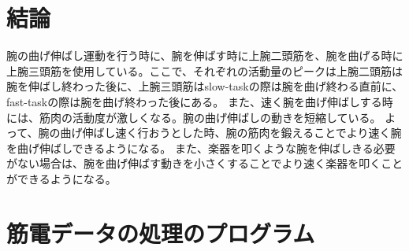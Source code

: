 \documentclass{jsarticle}
\begin{document}
% 
% 




\section{結論}
腕の曲げ伸ばし運動を行う時に、腕を伸ばす時に上腕二頭筋を、腕を曲げる時に上腕三頭筋を使用している。ここで、それぞれの活動量のピークは上腕二頭筋は腕を伸ばし終わった後に、上腕三頭筋はslow-taskの際は腕を曲げ終わる直前に、fast-taskの際は腕を曲げ終わった後にある。
また、速く腕を曲げ伸ばしする時には、筋肉の活動度が激しくなる。腕の曲げ伸ばしの動きを短縮している。
よって、腕の曲げ伸ばし速く行おうとした時、腕の筋肉を鍛えることでより速く腕を曲げ伸ばしできるようになる。
また、楽器を叩くような腕を伸ばしきる必要がない場合は、腕を曲げ伸ばす動きを小さくすることでより速く楽器を叩くことができるようになる。




\newpage
\appendix

\section{筋電データの処理のプログラム\label{prog1}}
\end{document}
